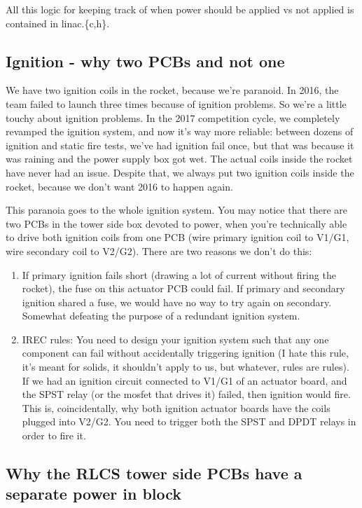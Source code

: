 \documentclass[11pt]{article}
\begin{document}
All this logic for keeping track of when power should be applied vs not
applied is contained in linac.\{c,h\}.

\subsection{Ignition - why two PCBs and not one}
\label{sec:orga0d12e6}

We have two ignition coils in the rocket, because we're paranoid. In 2016,
the team failed to launch three times because of ignition
problems. So we're a little touchy about ignition problems. In the 2017
competition cycle, we completely revamped the ignition system, and now it's
way more reliable: between dozens of ignition and static fire tests, we've
had ignition fail once, but that was because it was raining and the power
supply box got wet. The actual coils inside the rocket have never had an
issue. Despite that, we always put two ignition coils inside the rocket,
because we don't want 2016 to happen again.

This paranoia goes to the whole ignition system. You may notice that there
are two PCBs in the tower side box devoted to power, when you're
technically able to drive both ignition coils from one PCB (wire primary
ignition coil to V1/G1, wire secondary coil to V2/G2). There are two
reasons we don't do this:

\begin{enumerate}
\item If primary ignition fails short (drawing a lot of current without firing
the rocket), the fuse on this actuator PCB could fail. If primary and
secondary ignition shared a fuse, we would have no way to try again on
secondary. Somewhat defeating the purpose of a redundant ignition
system.
\item IREC rules: You need to design your ignition system such that any one
component can fail without accidentally triggering ignition (I hate this
rule, it's meant for solids, it shouldn't apply to us, but whatever,
rules are rules). If we had an ignition circuit connected to V1/G1 of an
actuator board, and the SPST relay (or the mosfet that drives it)
failed, then ignition would fire. This is, coincidentally, why both
ignition actuator boards have the coils plugged into V2/G2. You need to
trigger both the SPST and DPDT relays in order to fire it.
\end{enumerate}

\subsection{Why the RLCS tower side PCBs have a separate power in block}
\label{sec:orgc4db07f}
\end{document}
